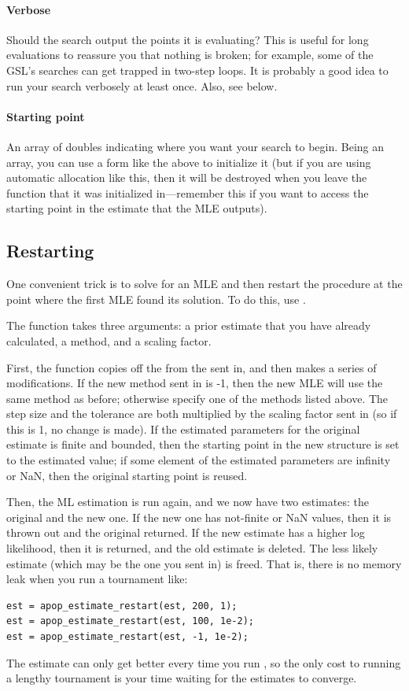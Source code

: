 \paragraph{Verbose} Should the search output the points it is evaluating?
This is useful for long evaluations to reassure you that nothing is
broken; for example, some of the GSL's searches can get trapped in two-step loops.
It is probably a good idea to run your search verbosely at least once.
Also, see  below.

\paragraph{Starting point} An array of doubles indicating where you want
your search to begin. Being an array, you can use a form like the above
to initialize it (but if you are using automatic allocation like this, then it will be destroyed when you leave the
function that it was initialized in---remember this if you want to
access the starting point in the estimate that the MLE outputs).


\subsection{Restarting} One convenient trick is to solve for an MLE and
then restart the procedure at the point where the first MLE found its solution.
To do this, use .

The function takes three arguments: a prior estimate that you have
already calculated, a method, and a scaling factor. 

First, the function copies off the 
from the  sent in, and then makes a series of
modifications.  If the new method sent in is -1, then the new MLE will
use the same method as before; otherwise specify one of the methods
listed above. The step size and the tolerance are both multiplied by the
scaling factor sent in (so if this is 1, no change is made). If the
estimated parameters for the original estimate is finite and bounded, then 
the starting point in the new 
structure is set to the estimated value; if some element of the
estimated parameters are infinity or NaN, then the original starting
point is reused.

Then, the ML estimation is run again, and we now have two estimates: the
original and the new one. If the new one has not-finite or NaN values,
then it is thrown out and the original returned. If the new estimate 
has a higher log likelihood, then it is returned, and the old estimate
is deleted.  The less likely estimate (which may be the one you sent in) is freed. That is,
there is no memory leak when you run a tournament like:
\begin{lstlisting}
est = apop_estimate_restart(est, 200, 1);
est = apop_estimate_restart(est, 100, 1e-2);
est = apop_estimate_restart(est, -1, 1e-2);
\end{lstlisting}
The estimate can only get better every time you run
, so the only cost to running a lengthy
tournament is your time waiting for the estimates to converge.


